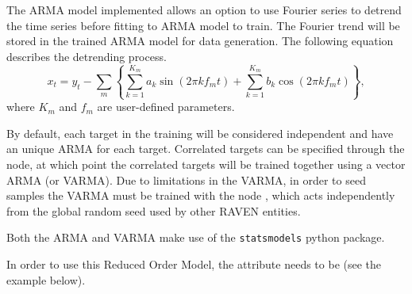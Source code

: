 The ARMA model implemented allows an option to use Fourier series to detrend the time series before fitting to ARMA model to
train. The Fourier trend will be stored in the trained ARMA model for data generation. The following equation
describes the detrending
process.
\begin{equation*}
x_t = y_t - \sum_m\left\{\sum_{k=1}^{K_m}a_k\sin(2\pi kf_mt)+\sum_{k=1}^{K_m}b_k\cos(2\pi kf_mt)\right\},
\end{equation*}
where $K_m$ and $f_m$ are user-defined parameters.

By default, each target in the training will be considered independent and have an unique ARMA for each
target.  Correlated targets can be specified through the  node, at which point
the correlated targets will be trained together using a vector ARMA (or VARMA). Due to limitations in
the VARMA, in order to seed samples the VARMA must be trained with the node , which acts
independently from the global random seed used by other RAVEN entities.

Both the ARMA and VARMA make use of the \texttt{statsmodels} python package.

%
In order to use this Reduced Order Model, the  attribute
 needs to be  (see the example
below).
%
\subnodeIntro

